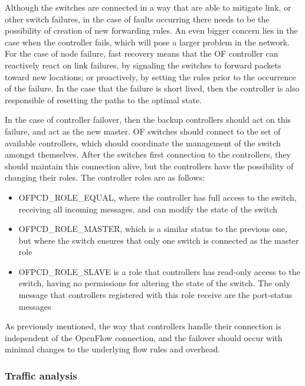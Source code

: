Although the switches are connected in a way that are able to mitigate link, or other switch failures, in the case of faults occurring there needs to be the possibility of creation of new forwarding rules. An even bigger 
concern lies in the case when the controller fails, which will pose a larger problem in the network. For the case of node failure, fast recovery means that the OF controller can reactively react on link failures, by signaling the
switches to forward packets toward new locations; or proactively, by setting the rules prior to the occurrence of the failure. In the case that the failure is short lived, then the controller is also responsible of resetting the 
paths to the optimal state.
\par In the case of controller failover, then the backup controllers should act on this failure, and act as the new master. OF switches should connect to the set of available controllers, which should coordinate the management of 
the switch amongst themselves. After the switches first connection to the controllers, they should maintain this connection alive, but the controllers have the possibility of changing their roles. The controller roles are as follows:

\begin {itemize}
    \item \textsc {OFPCD\_ROLE\_EQUAL}, where the controller has full access to the switch, receiving all incoming messages, and can modify the state of the switch
    \item \textsc {OFPCD\_ROLE\_MASTER}, which is a similar status to the previous one, but where the switch ensures that only one switch is connected as the master role
    \item \textsc {OFPCD\_ROLE\_SLAVE} is a role that controllers has read-only access to the switch, having no permissions for altering the state of the switch. The only message that controllers registered with this role receive
        are the port-status messages
\end {itemize}

As previously mentioned, the way that controllers handle their connection is independent of the OpenFlow connection, and the failover should occur with minimal changes to the underlying flow rules and overhead.

\subsubsection {Traffic analysis}


